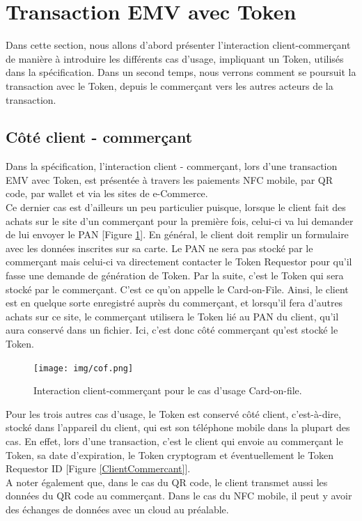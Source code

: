 \documentclass{report}
\begin{document}
\section{Transaction EMV avec Token}
Dans cette section, nous allons d'abord présenter l'interaction client-commerçant de manière à introduire les différents cas d'usage, impliquant un Token, utilisés dans la spécification. Dans un second temps, nous verrons comment se poursuit la transaction avec le Token, depuis le commerçant vers les autres acteurs de la transaction.

\subsection{Côté client - commerçant}
Dans la spécification, l'interaction client - commerçant, lors d'une transaction EMV avec Token, est présentée à travers les paiements NFC mobile, par QR code, par wallet et via les sites de e-Commerce.\\

\noindent
Ce dernier cas est d'ailleurs un peu particulier puisque, lorsque le client fait des achats sur le site d'un commerçant pour la première fois, celui-ci va lui demander de lui envoyer le PAN [Figure \ref{CardOnFile}]. En général, le client doit remplir un formulaire avec les données inscrites sur sa carte. Le PAN ne sera pas stocké par le commerçant mais celui-ci va directement contacter le Token Requestor pour qu'il fasse une demande de génération de Token. Par la suite, c'est le Token qui sera stocké par le commerçant. C'est ce qu'on appelle le Card-on-File. Ainsi, le client est en quelque sorte enregistré auprès du commerçant, et lorsqu'il fera d'autres achats sur ce site, le commerçant utilisera le Token lié au PAN du client, qu'il aura conservé dans un fichier. Ici, c'est donc côté commerçant qu'est stocké le Token.\\

\begin{figure}[!ht]
    \centering
			\texttt{[image: img/cof.png]}
			\caption{\label{CardOnFile} Interaction client-commerçant pour le cas d'usage Card-on-file.}			
\end{figure}

Pour les trois autres cas d'usage, le Token est conservé côté client, c'est-à-dire, stocké dans l'appareil du client, qui est son téléphone mobile dans la plupart des cas. En effet, lors d'une transaction, c'est le client qui envoie au commerçant le Token, sa date d'expiration, le Token cryptogram et éventuellement le Token Requestor ID [Figure \ref{ClientCommercant}].\\
A noter également que, dans le cas du QR code, le client transmet aussi les données du QR code au commerçant. Dans le cas du NFC mobile, il peut y avoir des échanges de données avec un cloud au préalable.
\end{document}
